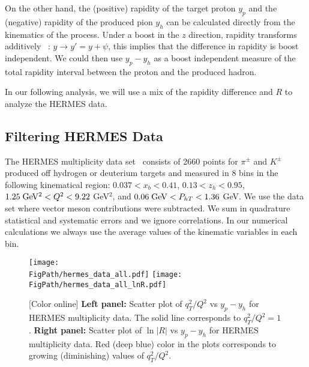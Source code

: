 \documentclass[final,3p,times,onecolumn,sort&compress,hidelinks]{elsarticle}
\newcommand{\xbj}{x_b}
\newcommand*{\FigPath}{../Figs/}%
\begin{document}
On the other hand, the (positive) rapidity of the target proton $y_p$ and the (negative) rapidity of the produced pion $y_h$ can be calculated directly from the kinematics of the process. 
 Under a boost in the  $z$ direction, rapidity transforms additively ~\cite{Collins:2011zzd}: $y \to y' = y+\psi$, this implies that the difference in rapidity is boost independent.
We could then use $y_p - y_h$ as a boost independent measure of the total rapidity interval between the proton and the produced hadron.

In our following analysis, we will use a mix of the rapidity difference and $R$ to analyze the HERMES data.

\subsection{Filtering HERMES Data} 

The HERMES multiplicity data set~\cite{Airapetian:2012ki} consists of 2660 points for $\pi^\pm$ and $K^\pm$ produced off hydrogen or deuterium targets and measured in 8 bins in the following kinematical region: $0.037 < \xbj < 0.41$, $0.13 < z_h < 0.95$, $1.25\; {\rm GeV^2} < Q^2 < 9.22$ GeV$^2$,  and $0.06 \; {\rm GeV} < P_{hT} < 1.36$ GeV. We use the data set where vector meson contributions were subtracted. We sum in quadrature statistical and systematic errors and we ignore correlations. In our numerical calculations we always use the average values of the kinematic variables in each bin.
\begin{figure}[htb!]
\centering
\texttt{[image: \\FigPath/hermes\_data\_all.pdf]}
\texttt{[image: \\FigPath/hermes\_data\_all\_lnR.pdf]}
\caption{\label{Fig:hermes_data_rapidity}
[Color online]  {\bf Left panel:} Scatter plot of $q_T^2/Q^2$ vs $y_p-y_h$ for HERMES multiplicity data.  The solid line corresponds to $q_T^2/Q^2=1$. {\bf Right panel:} Scatter plot of $\ln|R|$  vs $y_p-y_h$ for HERMES multiplicity data. Red (deep blue) color in the plots corresponds to growing (diminishing) values of $q_T^2/Q^2$.
}
\end{figure}
\end{document}
